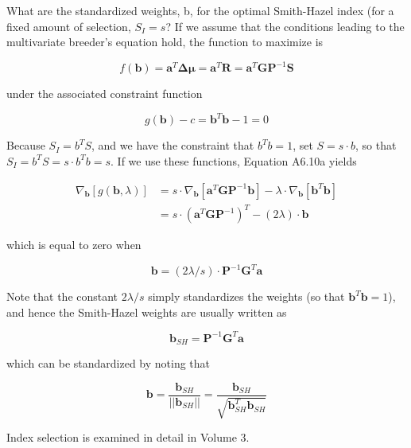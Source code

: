 \documentclass{article}
\begin{document}
What are the standardized weights, b, for the optimal Smith-Hazel index (for a fixed amount of selection,  $ S_I = s $? If we assume that the conditions leading to the multivariate breeder's equation hold, the function to maximize is

\begin{equation}
f(\mathbf{b})=\mathbf{a}^{T}\boldsymbol{\Delta}\boldsymbol{\mu}=\mathbf{a}^{T}\mathbf{R}=\mathbf{a}^{T}\mathbf{G}\mathbf{P}^{-1}\mathbf{S}
\end{equation}

under the associated constraint function

\begin{equation}
g(\mathbf{b})-c=\mathbf{b}^{T}\mathbf{b}-1=0
\end{equation}

Because $S_I = b^T S$, and we have the constraint that $b^T b = 1$, set $S = s \cdot b$, so that $S_I = b^T S = s \cdot b^T b = s$. If we use these functions, Equation A6.10a yields

\begin{equation}
\begin{aligned}\nabla_{\mathbf{b}}[g(\mathbf{b},\lambda)]&=s\cdot\nabla_{\mathbf{b}}[\mathbf{a}^{T}\mathbf{G}\mathbf{P}^{-1}\mathbf{b}]-\lambda\cdot\nabla_{\mathbf{b}}[\mathbf{b}^{T}\mathbf{b}]\\&=s\cdot\left(\mathbf{a}^{T}\mathbf{G}\mathbf{P}^{-1}\right)^{T}-(2\lambda)\cdot\mathbf{b}\end{aligned}
\end{equation}

which is equal to zero when

\begin{equation}
\mathbf{b}=(2\lambda/s)\cdot\mathbf{P}^{-1}\mathbf{G}^{T}\mathbf{a}
\end{equation}

Note that the constant  $ 2\lambda/s $ simply standardizes the weights (so that  $ \mathbf{b}^T\mathbf{b}=1 $), and hence the Smith-Hazel weights are usually written as

\begin{equation}
\mathbf{b}_{SH}=\mathbf{P}^{-1}\mathbf{G}^{T}\mathbf{a}
\end{equation}

which can be standardized by noting that

\begin{equation}
\mathbf{b}=\frac{\mathbf{b}_{SH}}{\left|\left|\mathbf{b}_{SH}\right|\right|}=\frac{\mathbf{b}_{SH}}{\sqrt{\mathbf{b}_{SH}^{T}\mathbf{b}_{SH}}}
\end{equation}

Index selection is examined in detail in Volume 3.
\end{document}
